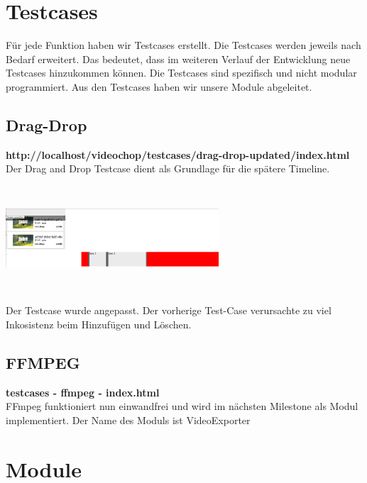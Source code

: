 \documentclass[a4paper,10pt]{scrartcl}
\begin{document}
\section{Testcases}
Für jede Funktion haben wir Testcases erstellt. Die Testcases werden jeweils nach Bedarf erweitert. Das bedeutet, dass im weiteren Verlauf der Entwicklung neue Testcases hinzukommen können. Die Testcases sind spezifisch und nicht modular programmiert. Aus den Testcases haben wir unsere Module abgeleitet.
\subsection{Drag-Drop}
\textbf{http://localhost/videochop/testcases/drag-drop-updated/index.html} \\
Der Drag and Drop Testcase dient als Grundlage für die spätere Timeline.\\
\includegraphics[height=176px, width=300px]{images/draganddrop.png}\\
Der Testcase wurde angepasst. Der vorherige Test-Case verursachte zu viel Inkosistenz beim Hinzufügen und Löschen.
\subsection{FFMPEG}
\textbf{testcases - ffmpeg - index.html} \\
FFmpeg funktioniert nun einwandfrei und wird im nächsten Milestone als Modul implementiert. Der Name des Moduls ist VideoExporter
\newpage
\section{Module}
\end{document}

